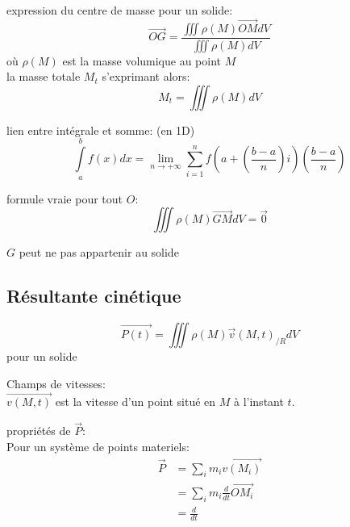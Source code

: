 \documentclass[../main.tex]{subfile}
\begin{document}
\begin{defi}
	expression du centre de masse pour un solide:
	$$\vec{OG} = \frac{\iiint \rho(M) \vec{OM} dV}{\iiint \rho(M) dV}$$
	où $\rho(M)$ est la masse volumique au point $M$ \\
	la masse totale $M_t$ s'exprimant alors:
	$$M_t = \iiint \rho(M) dV$$
\end{defi}

\begin{rema}
	lien entre intégrale et somme: (en 1D)\\
	$$\int\limits_a^b f(x)dx = \lim\limits_{n \to +\infty} \sum\limits_{i = 1}^n f(a+(\frac{b-a}{n})i)(\frac{b-a}{n})$$
\end{rema}

\begin{rema}
	formule vraie pour tout $O$:
	$$\iiint \rho(M) \vec{GM} dV = \vec{0}$$
\end{rema}

\begin{rema}
	$G$ peut ne pas appartenir au solide 
\end{rema}

\subsection{Résultante cinétique}
\begin{defi}
	$$\vec{P(t)} = \iiint \rho(M) \vec{v}(M, t)_{/R} dV$$
	pour un solide\\
\end{defi}

\begin{defi}
	Champs de vitesses:\\
	$\vec{v(M, t)}$ est la vitesse d'un point situé en $M$ à l'instant $t$.
\end{defi}

\begin{propri}
	propriétés de $\vec{P}$:\\
	Pour un système de points materiels:
	$$
\begin{aligned}
	\vec{P} &= \sum_i m_i \vec{v(M_i)}\\
	&= \sum_i m_i \frac{d}{dt} \vec{OM_i}\\
	&= \frac{d}{dt}
\end{aligned}
	$$
\end{propri}
\end{document}
